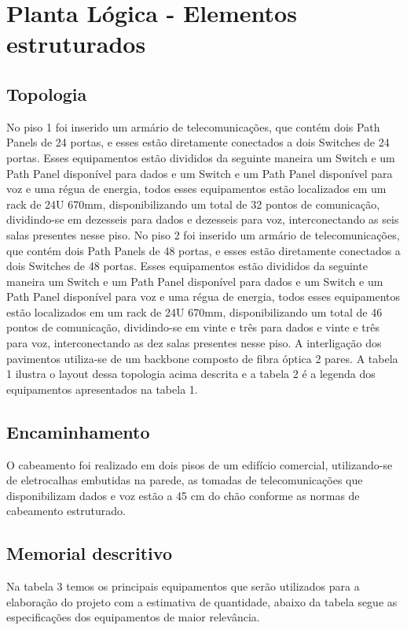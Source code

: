 \documentclass[	DIV=calc,%
							paper=a4,%
							fontsize=12pt,%
							onecolumn]{scrartcl}	 					%
\begin{document}
\section{Planta Lógica - Elementos estruturados}

\subsection{Topologia}
No piso 1 foi inserido um armário de telecomunicações, que contém dois Path Panels de 24 portas, e esses estão diretamente conectados a dois Switches de 24 portas. Esses equipamentos estão divididos da seguinte maneira um Switch e um Path Panel disponível para dados e um Switch e um Path Panel disponível para voz e uma régua de energia, todos esses equipamentos estão localizados em um rack de 24U 670mm, disponibilizando um total de 32 pontos de comunicação, dividindo-se em dezesseis para dados e dezesseis para voz, interconectando as seis salas presentes nesse piso.
No piso 2 foi inserido um armário de telecomunicações, que contém dois Path Panels de 48 portas, e esses estão diretamente conectados a dois Switches de 48 portas. Esses equipamentos estão divididos da seguinte maneira um Switch e um Path Panel disponível para dados e um Switch e um Path Panel disponível para voz e uma régua de energia, todos esses equipamentos estão localizados em um rack de 24U 670mm, disponibilizando um total de 46 pontos de comunicação, dividindo-se em vinte e três para dados e vinte e três para voz, interconectando as dez salas presentes nesse piso. A interligação dos pavimentos utiliza-se de um backbone composto de fibra óptica 2 pares.
A tabela 1 ilustra o layout dessa topologia acima descrita e a tabela 2 é a legenda dos equipamentos apresentados na tabela 1.




\subsection{Encaminhamento}
O cabeamento foi realizado em dois pisos de um edifício comercial, utilizando-se de eletrocalhas embutidas na parede, as tomadas de telecomunicações que disponibilizam dados e voz estão a 45 cm do chão conforme as normas de cabeamento estruturado.

\subsection{Memorial descritivo}
Na tabela 3 temos os principais equipamentos que serão utilizados para a elaboração do projeto com a estimativa de quantidade, abaixo da tabela segue as especificações dos equipamentos de maior relevância.

\end{document}
